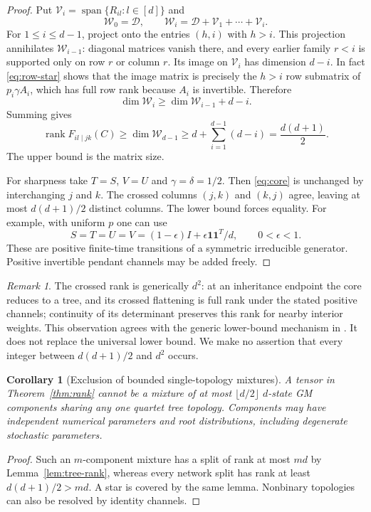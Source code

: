 \documentclass[11pt]{article}
\newtheorem{corollary}[theorem]{Corollary}
\theoremstyle{definition}
\theoremstyle{remark}
\newtheorem{remark}[theorem]{Remark}
\DeclareMathOperator{\rank}{rank}
\newcommand{\one}{\mathbf 1}
\begin{document}
\begin{proof}
Put $\mathcal V_i=\operatorname{span}\{R_{il}:l\in[d]\}$ and
\[
 \mathcal W_0=\mathcal D,\qquad
 \mathcal W_i=\mathcal D+\mathcal V_1+\cdots+\mathcal V_i.
\]
For $1\le i\le d-1$, project onto the entries $(h,i)$ with $h>i$.
This projection annihilates $\mathcal W_{i-1}$: diagonal matrices vanish
there, and every earlier family $r<i$ is supported only on row $r$ or
column $r$. Its image on $\mathcal V_i$ has dimension $d-i$.
In fact \eqref{eq:row-star} shows that the image matrix is precisely the
$h>i$ row submatrix of $p_i\gamma A_i$, which has full row rank because
$A_i$ is invertible. Therefore
\[
 \dim\mathcal W_i\ge\dim\mathcal W_{i-1}+d-i.
\]
Summing gives
\[
 \rank F_{il\mid jk}(C)\ge\dim\mathcal W_{d-1}
 \ge d+\sum_{i=1}^{d-1}(d-i)=\frac{d(d+1)}2.
\]
The upper bound is the matrix size.

For sharpness take $T=S$, $V=U$ and $\gamma=\delta=1/2$.
Then \eqref{eq:core} is unchanged by interchanging $j$ and $k$.
The crossed columns $(j,k)$ and $(k,j)$ agree, leaving at most
$d(d+1)/2$ distinct columns. The lower bound forces equality.
For example, with uniform $p$ one can use
\begin{equation}\label{eq:sharp-example}
 S=T=U=V=(1-\epsilon)I+\epsilon\one\one^T/d,
 \qquad 0<\epsilon<1.
\end{equation}
These are positive finite-time transitions of a symmetric irreducible
generator. Positive invertible pendant channels may be added freely.
\end{proof}

\begin{remark}
The crossed rank is generically $d^2$: at an inheritance endpoint the core
reduces to a tree, and its crossed flattening is full rank under the stated
positive channels; continuity of its determinant preserves this rank for
nearby interior weights. This observation agrees with the generic
lower-bound mechanism in \cite{Sullivant2026}. It does not replace the
universal lower bound. We make no assertion that every integer between
$d(d+1)/2$ and $d^2$ occurs.
\end{remark}

\begin{corollary}[Exclusion of bounded single-topology mixtures]
\label{cor:mixture}
A tensor in Theorem~\ref{thm:rank} cannot be a mixture of at most
$\lfloor d/2\rfloor$ $d$-state GM components sharing any one quartet tree
topology. Components may have independent numerical parameters and root
distributions, including degenerate stochastic parameters.
\end{corollary}
\begin{proof}
Such an $m$-component mixture has a split of rank at most $md$ by
Lemma~\ref{lem:tree-rank}, whereas every network split has rank at least
$d(d+1)/2>md$. A star is covered by the same lemma. Nonbinary topologies
can also be resolved by identity channels.
\end{proof}
\end{document}
